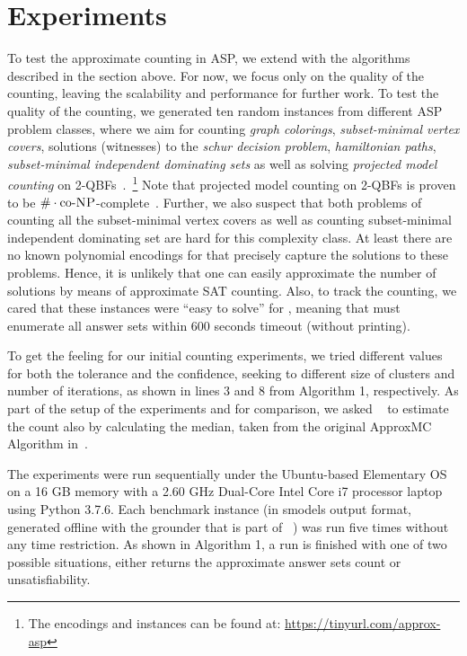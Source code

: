 \section{Experiments} \label{sec:experiments}

To test the approximate counting in ASP, we extend \xorro{} with the algorithms described in the section above.
For now, we focus only on the quality of the counting, leaving the scalability and performance for further work.
%
To test the quality of the counting,
we generated ten random instances from different ASP problem classes, where we aim for counting \emph{graph colorings}, \emph{subset-minimal vertex covers}, solutions (witnesses) to the \emph{schur decision problem}, \emph{hamiltonian paths}, \emph{subset-minimal independent dominating sets} as well as solving \emph{projected model counting} on 2-QBFs~\cite{DurandHermannKolaitis05,KleineBuningLettman99}.~\footnote{The encodings and instances can be found at: \url{https://tinyurl.com/approx-asp}}
Note that projected model counting on 2-QBFs is proven to be $\#\cdot\text{co-}\textsc{NP}$-complete~\cite{DurandHermannKolaitis05}. Further, we also suspect that both problems of counting all the subset-minimal vertex covers as well as counting subset-minimal independent dominating set are hard for this complexity class. At least there are no known polynomial encodings for \SAT that precisely capture the solutions to these problems. Hence, it is unlikely that one can easily approximate the number of solutions by means of approximate SAT counting.
Also, to track the counting, we cared that these instances were ``easy to solve'' for \clingo{},
meaning that \clingo{} must enumerate all answer sets within 600 seconds timeout (without printing).

To get the feeling for our initial counting experiments, we tried different values for both the tolerance and the confidence, seeking to different size of clusters and number of iterations,
as shown in lines 3 and 8 from Algorithm 1, respectively.
As part of the setup of the experiments and for comparison, we asked \xorro{}~\cite{DBLP:conf/lpnmr/EverardoJKS19}  to estimate the count also by calculating the median, taken from the original ApproxMC Algorithm in~\cite{ChakrabortyMV13}.

The experiments were run sequentially under the Ubuntu-based Elementary OS on a 16 GB memory with a 2.60 GHz Dual-Core Intel Core i7 processor laptop using Python 3.7.6.
Each benchmark instance (in smodels output format, generated offline with the grounder \gringo{} that is part of \clingo{}~\cite{DBLP:conf/iclp/GebserKKOSW16}) was run five times without any time restriction. 
As shown in Algorithm 1, a run is finished with one of two possible situations, either \xorro{} returns the approximate answer sets count or unsatisfiability.

